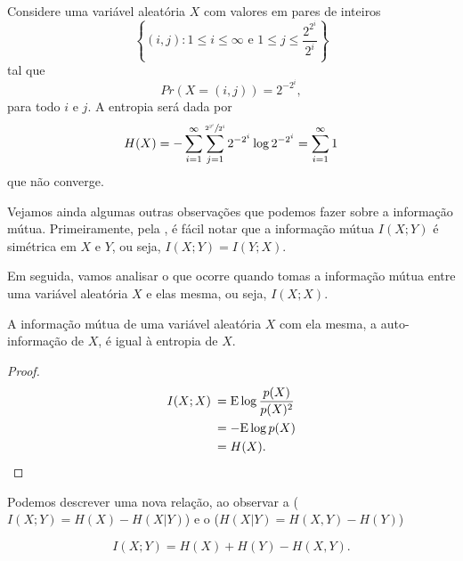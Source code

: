 \begin{example}
  Considere uma variável aleatória $X$ com valores em pares de inteiros
  \begin{equation}
    \left\{ (i,j) : 1 \leq i \leq \infty \text{ e } 1 \leq j \leq \frac{2^{2^i}}{2^i} \right\}
  \end{equation}
  tal que 
  \begin{equation}
    Pr(X = (i,j)) = 2^{-2^i} ,
  \end{equation}
  para todo $i$ e $j$.
  A entropia será dada por 
  \begin{equation}
    H(X) = - \sum_{i=1}^{\infty} \sum_{j=1}^{\sfrac{2^{2^i}}{2^i}} 2^{-2^i} \log 2^{-2^i} = \sum_{i=1}^{\infty} 1 
  \end{equation}
  que não converge.
\end{example}


Vejamos ainda algumas outras observações que podemos fazer sobre a
informação mútua.
Primeiramente, pela , é fácil notar que
a informação mútua $I(X;Y)$ é simétrica em $X$ e $Y$, ou seja, $I(X;Y) = I(Y;X)$.

Em seguida, vamos analisar o que ocorre quando tomas a informação mútua
entre uma variável aleatória $X$ e elas mesma, ou seja, $I(X;X)$.
\begin{proposition}
A informação mútua de uma variável aleatória $X$ com ela mesma, a auto-informação de $X$,
é igual à entropia de $X$.
\end{proposition}

\begin{proof}
\begin{subequations}\label{eq:autoinform}
\begin{align}
I(X;X) \: &= \mathrm{E} \log \frac{p(X)}{p(X)^2} \\
          &= -\mathrm{E} \log p(X) \\
	  &= H(X) .
\end{align}
\end{subequations}
\end{proof}

Podemos descrever uma nova relação, ao observar a 
($I(X;Y) = H(X) - H(X|Y)$) e o  ($H(X|Y) = H(X,Y) - H(Y)$)
\begin{proposition}
\begin{equation}
    I(X;Y) = H(X) + H(Y) - H(X,Y) .
\end{equation}
\end{proposition}

